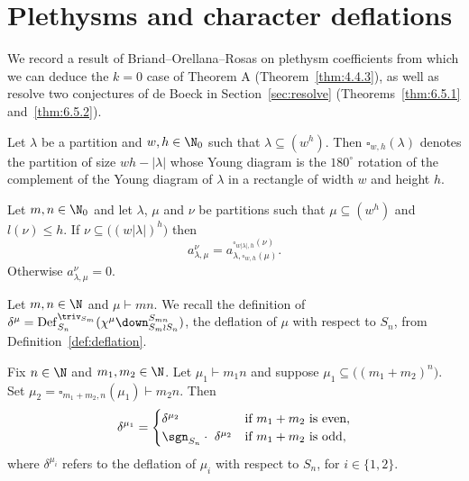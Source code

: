 \section{Plethysms and character deflations}\label{sec:pre-recursive-formula}
We record a result of Briand--Orellana--Rosas on plethysm coefficients from which we can deduce the $k=0$ case of Theorem A (Theorem~\ref{thm:4.4.3}), as well as resolve two conjectures of de Boeck in Section~\ref{sec:resolve} (Theorems~\ref{thm:6.5.1} and~\ref{thm:6.5.2}).

\begin{definition}
	Let $\lambda$ be a partition and $w,h\in\N_0$ such that $\lambda\subseteq (w^h)$. Then $\square_{w,h}(\lambda)$ denotes the partition of size $wh-|\lambda|$ whose Young diagram is the $180^\circ$ rotation of the complement of the Young diagram of $\lambda$ in a rectangle of width $w$ and height $h$.
\end{definition}

\begin{theorem}\label{thm:BOR}
	Let $m,n\in\N_0$ and let $\lambda$, $\mu$ and $\nu$ be partitions such that $\mu\subseteq(w^h)$ and $l(\nu)\le h$. If $\nu\subseteq \big((w|\lambda|)^h\big)$ then
	\[ a^\nu_{\lambda,\mu} = a^{\square_{w|\lambda|,h}(\nu)}_{\lambda,\square_{w,h}(\mu)}. \]
	Otherwise $a^\nu_{\lambda,\mu}=0$.
\end{theorem}

Let $m,n\in\N$ and $\mu\vdash mn$. We recall the definition of $\delta^\mu=\operatorname{Def}^{\triv_{S_m}}_{S_n}(\chi^\mu\down^{S_{mn}}_{S_m\wr S_n})$, the deflation of $\mu$ with respect to $S_n$, from Definition~\ref{def:deflation}.
\begin{proposition}\label{prop:12.4}
	Fix $n\in\N$ and $m_1,m_2\in\N$. Let $\mu_1\vdash m_1n$ and suppose $\mu_1\subseteq \big((m_1+m_2)^n\big)$. Set $\mu_2=\square_{m_1+m_2,n}(\mu_1)\vdash m_2n$. Then
	\[ \delta^{\mu_1} = \begin{cases}
		\delta^{\mu_2} & \text{if }m_1+m_2\text{ is even},\\
		\sgn_{S_n}\cdot\ \delta^{\mu_2} & \text{if }m_1+m_2\text{ is odd},
	\end{cases}
	\]
	where $\delta^{\mu_i}$ refers to the deflation of $\mu_i$ with respect to $S_n$, for $i\in\{1,2\}$.
\end{proposition}

